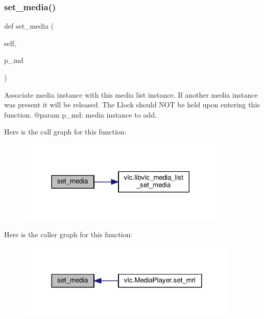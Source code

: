 \subsubsection{\texorpdfstring{set\+\_\+media()}{set\_media()}}
{\footnotesize\ttfamily def set\+\_\+media (\begin{DoxyParamCaption}\item[{}]{self,  }\item[{}]{p\+\_\+md }\end{DoxyParamCaption})}

\begin{DoxyVerb}Associate media instance with this media list instance.
If another media instance was present it will be released.
The L{lock} should NOT be held upon entering this function.
@param p_md: media instance to add.
\end{DoxyVerb}
 Here is the call graph for this function\+:
\nopagebreak
\begin{figure}[H]
\begin{center}
\leavevmode
\includegraphics[width=282pt]{classvlc_1_1_media_list_a8d4d4151676c2941cdd0cee4e25648c5_cgraph}
\end{center}
\end{figure}
Here is the caller graph for this function\+:
\nopagebreak
\begin{figure}[H]
\begin{center}
\leavevmode
\includegraphics[width=300pt]{classvlc_1_1_media_list_a8d4d4151676c2941cdd0cee4e25648c5_icgraph}
\end{center}
\end{figure}
\mbox{\label{classvlc_1_1_media_list_a3aa5c7a8b194766605bd44948ae9588c}} 
